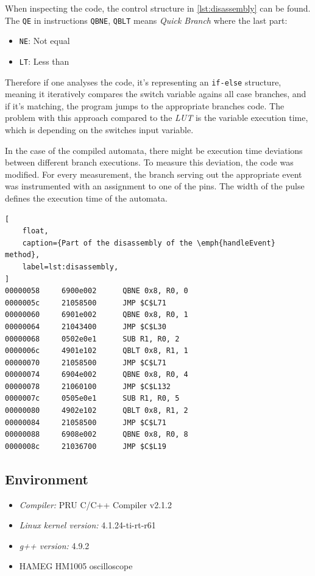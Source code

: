 When inspecting the code, the control structure in \cref{lst:disassembly} can be found. The \texttt{QE} in instructions \texttt{QBNE}, \texttt{QBLT} means \emph{Quick Branch} where the last part:
\begin{itemize}
	\item \texttt{NE}: Not equal
	\item \texttt{LT}: Less than
\end{itemize}

Therefore if one analyses the code, it's representing an \texttt{if-else} structure, meaning it iteratively compares the switch variable agains all case branches, and if it's matching, the program jumps to the appropriate branches code. The problem with this approach compared to the \emph{LUT} is the variable execution time, which is depending on the switches input variable.

In the case of the compiled automata, there might be execution time deviations between different branch executions. To measure this deviation, the code was modified. For every measurement, the branch serving out the appropriate event was instrumented with an assignment to one of the \gpio{} pins. The width of the pulse defines the execution time of the automata.

\begin{lstlisting}[
	float,
	caption={Part of the disassembly of the \emph{handleEvent} method},
	label=lst:disassembly,
]
00000058     6900e002      QBNE 0x8, R0, 0
0000005c     21058500      JMP $C$L71
00000060     6901e002      QBNE 0x8, R0, 1
00000064     21043400      JMP $C$L30
00000068     0502e0e1      SUB R1, R0, 2
0000006c     4901e102      QBLT 0x8, R1, 1
00000070     21058500      JMP $C$L71
00000074     6904e002      QBNE 0x8, R0, 4
00000078     21060100      JMP $C$L132
0000007c     0505e0e1      SUB R1, R0, 5
00000080     4902e102      QBLT 0x8, R1, 2
00000084     21058500      JMP $C$L71
00000088     6908e002      QBNE 0x8, R0, 8
0000008c     21036700      JMP $C$L19
\end{lstlisting}


\subsection{Environment}
\begin{itemize}
	\item \emph{Compiler:} PRU C/C++ Compiler v2.1.2
	\item \emph{Linux kernel version:} 4.1.24-ti-rt-r61
	\item \emph{g++ version:} 4.9.2
	\item HAMEG HM1005 oscilloscope
\end{itemize}

